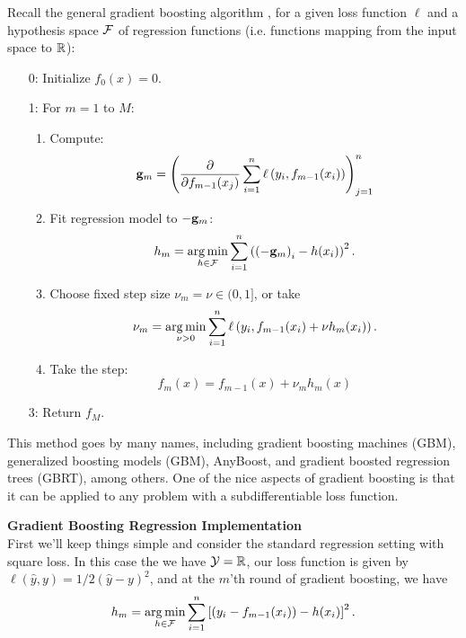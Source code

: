 \documentclass{article}
\newcommand{\nyuparagraph}[1]{\vspace{0.3cm}\textcolor{nyupurple}{\bf \large #1}\\}
\theoremstyle{plain}
\theoremstyle{definition}
\begin{document}
Recall the general gradient boosting algorithm
, for a given loss function $\ell$ and a hypothesis space $\mathcal{F}$
of regression functions (i.e. functions mapping from the input space
to $\mathbb{R}$): 
\begin{enumerate}
\setcounter{enumi}{\value{saveenum}}
\item[0:] Initialize $f_{0}(x)=0$. 
\item[1:] For $m=1$ to $M$:

\begin{enumerate}
\item Compute: 
\[
{\bf g}_{m}=\left( \frac{\partial}{\partial f_{m-1}(x_{j})}\sum_{i=1}^{n}\ell\left(y_{i},f_{m-1}(x_{i})\right)\right)_{j=1}^{n}
\]
\item Fit regression model to $-{\bf g}_{m}$: 
\[
h_{m}=\argmin_{h\in\cf}\sum_{i=1}^{n}\left(\left(-{\bf g}_{m}\right)_{i}-h(x_{i})\right)^{2}.
\]
\item Choose fixed step size $\nu_{m}=\nu\in(0,1]$, or take 
\[
\nu_{m}=\argmin_{\nu>0}\sum_{i=1}^{n}\ell\left(y_{i},f_{m-1}(x_{i})+\nu h_{m}(x_{i})\right).
\]
\item Take the step: 
\[
f_{m}(x)=f_{m-1}(x)+\nu_{m}h_{m}(x)
\]
\end{enumerate}
\item[3:] Return $f_{M}$. 
\end{enumerate}


This method goes by many names, including gradient boosting machines
(GBM), generalized boosting models (GBM), AnyBoost, and gradient boosted
regression trees (GBRT), among others. One of the nice aspects
of gradient boosting is that it can be applied to any problem with
a subdifferentiable loss function.


\nyuparagraph{Gradient Boosting Regression Implementation}
First we'll keep things simple and consider the standard regression setting with square loss. In this case the we have $\mathcal{Y}=\mathbb{R}$, our
loss function is given by $
\ell(\hat{y},y)=1/2\left(\hat{y}-y\right)^{2}$,
and at the $m$'th round of gradient boosting, we
have
\[
h_{m}=\argmin_{h\in\cf}\sum_{i=1}^{n}\left[\left(y_{i}-f_{m-1}(x_{i})\right)-h(x_{i})\right]^{2}.
\]
\end{document}

